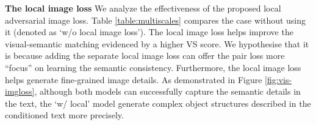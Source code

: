 \documentclass[10pt,twocolumn,letterpaper]{article}
\begin{document}

\textbf{The local image loss} We analyze the effectiveness of the proposed local adversarial image loss. 
Table \ref{table:multiscales} compares the case without using it (denoted as `w/o local image loss').
The local image loss helps improve the visual-semantic matching evidenced by a higher VS score. We hypothesise that it is because adding the separate local image loss can offer the pair loss more ``focus'' on learning the semantic consistency. 
Furthermore, the local image loss helps generate fine-grained image details. As demonstrated in Figure \ref{fig:vis-imgloss}, although both models can successfully capture the semantic details in the text, the `w/ local' model generate complex object structures described in the conditioned text more precisely. 




%            
\end{document}

